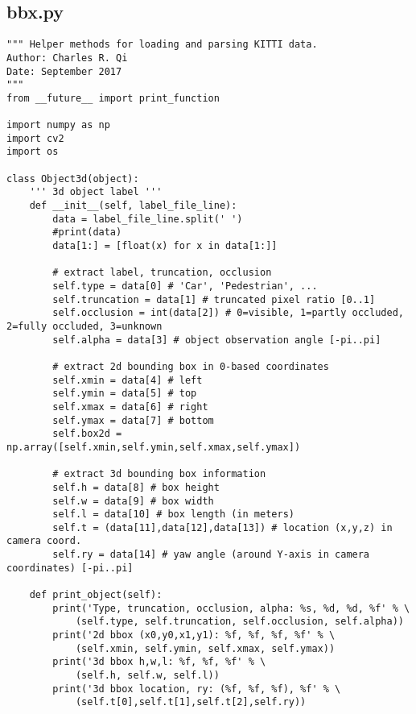 \subsection*{bbx.py}
\begin{lstlisting}
""" Helper methods for loading and parsing KITTI data.
Author: Charles R. Qi
Date: September 2017
"""
from __future__ import print_function

import numpy as np
import cv2
import os

class Object3d(object):
    ''' 3d object label '''
    def __init__(self, label_file_line):
        data = label_file_line.split(' ')
        #print(data)
        data[1:] = [float(x) for x in data[1:]]

        # extract label, truncation, occlusion
        self.type = data[0] # 'Car', 'Pedestrian', ...
        self.truncation = data[1] # truncated pixel ratio [0..1]
        self.occlusion = int(data[2]) # 0=visible, 1=partly occluded, 2=fully occluded, 3=unknown
        self.alpha = data[3] # object observation angle [-pi..pi]

        # extract 2d bounding box in 0-based coordinates
        self.xmin = data[4] # left
        self.ymin = data[5] # top
        self.xmax = data[6] # right
        self.ymax = data[7] # bottom
        self.box2d = np.array([self.xmin,self.ymin,self.xmax,self.ymax])
        
        # extract 3d bounding box information
        self.h = data[8] # box height
        self.w = data[9] # box width
        self.l = data[10] # box length (in meters)
        self.t = (data[11],data[12],data[13]) # location (x,y,z) in camera coord.
        self.ry = data[14] # yaw angle (around Y-axis in camera coordinates) [-pi..pi]

    def print_object(self):
        print('Type, truncation, occlusion, alpha: %s, %d, %d, %f' % \
            (self.type, self.truncation, self.occlusion, self.alpha))
        print('2d bbox (x0,y0,x1,y1): %f, %f, %f, %f' % \
            (self.xmin, self.ymin, self.xmax, self.ymax))
        print('3d bbox h,w,l: %f, %f, %f' % \
            (self.h, self.w, self.l))
        print('3d bbox location, ry: (%f, %f, %f), %f' % \
            (self.t[0],self.t[1],self.t[2],self.ry))



\end{lstlisting}
